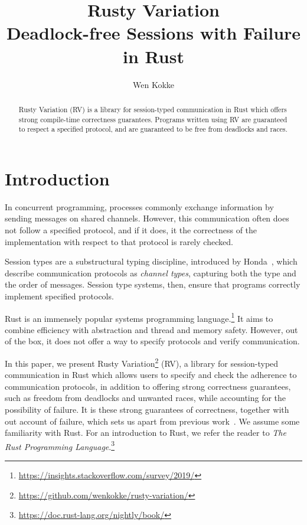 \documentclass[copyright,creativecommons]{eptcs}
\title{Rusty Variation\\ Deadlock-free Sessions with Failure in Rust}
\author{Wen Kokke
  \institute{LFCS, University of Edinburgh, 10 Crichton St, EH8 9AB, Edinburgh, United Kingdom}
  \email{wen.kokke@ed.ac.uk}
}
\begin{document}
\maketitle

\begin{abstract}
  Rusty Variation (RV) is a library for session-typed communication in Rust which offers strong compile-time correctness guarantees. Programs written using RV are guaranteed to respect a specified protocol, and are guaranteed to be free from deadlocks and races.
\end{abstract}

\section{Introduction}\label{sec:introduction}
In concurrent programming, processes commonly exchange information by sending messages on shared channels. However, this communication often does not follow a specified protocol, and if it does, it the correctness of the implementation with respect to that protocol is rarely checked.

Session types are a substructural typing discipline, introduced by Honda~\cite{honda1993}, which describe communication protocols as \emph{channel types}, capturing both the type and the order of messages. Session type systems, then, ensure that programs correctly implement specified protocols.

Rust is an immensely popular systems programming language.\footnote{\url{https://insights.stackoverflow.com/survey/2019/}} It aims to combine efficiency with abstraction and thread and memory safety. However, out of the box, it does not offer a way to specify protocols and verify communication.

In this paper, we present Rusty Variation\footnote{\url{https://github.com/wenkokke/rusty-variation/}} (RV), a library for session-typed communication in Rust which allows users to specify and check the adherence to communication protocols, in addition to offering strong correctness guarantees, such as freedom from deadlocks and unwanted races, while accounting for the possibility of failure. It is these strong guarantees of correctness, together with out account of failure, which sets us apart from previous work~\cite{jespersen2015}. We assume some familiarity with Rust. For an introduction to Rust, we refer the reader to \textit{The Rust Programming Language}.\footnote{\url{https://doc.rust-lang.org/nightly/book/}}
\end{document}
